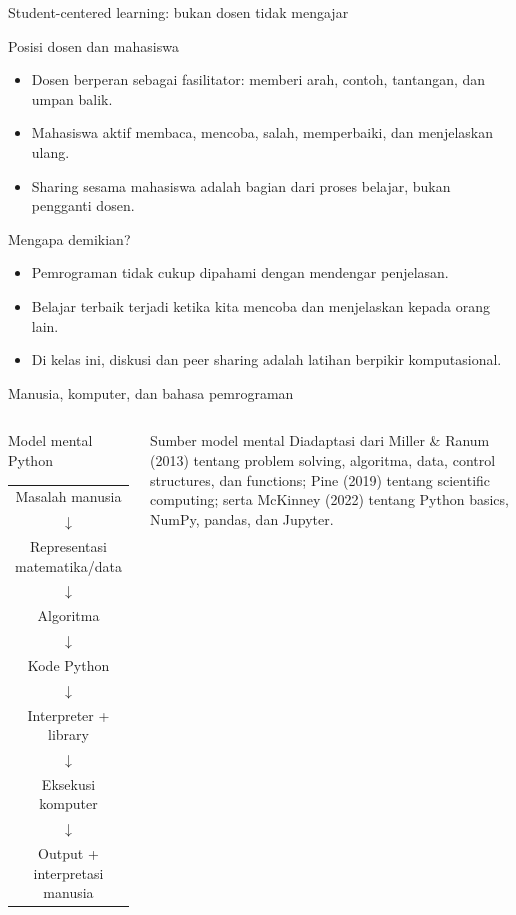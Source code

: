 \documentclass[aspectratio=169,11pt]{beamer}
\begin{document}
\begin{frame}{Student-centered learning: bukan dosen tidak mengajar}
\begin{block}{Posisi dosen dan mahasiswa}
\begin{itemize}
  \item Dosen berperan sebagai fasilitator: memberi arah, contoh, tantangan, dan umpan balik.
  \item Mahasiswa aktif membaca, mencoba, salah, memperbaiki, dan menjelaskan ulang.
  \item Sharing sesama mahasiswa adalah bagian dari proses belajar, bukan pengganti dosen.
\end{itemize}
\end{block}
\begin{block}{Mengapa demikian?}
\begin{itemize}
  \item Pemrograman tidak cukup dipahami dengan mendengar penjelasan.
  \item Belajar terbaik terjadi ketika kita mencoba dan menjelaskan kepada orang lain.
  \item Di kelas ini, diskusi dan peer sharing adalah latihan berpikir komputasional.
\end{itemize}
\end{block}
\end{frame}

\begin{frame}{Manusia, komputer, dan bahasa pemrograman}
\begin{columns}[T]
\begin{block}{Model mental Python}
\centering
\begin{tabular}{c}
Masalah manusia \\
$\downarrow$ \\
Representasi matematika/data \\
$\downarrow$ \\
Algoritma \\
$\downarrow$ \\
Kode Python \\
$\downarrow$ \\
Interpreter + library \\
$\downarrow$ \\
Eksekusi komputer \\
$\downarrow$ \\
Output + interpretasi manusia
\end{tabular}
\end{block}
\begin{block}{Sumber model mental}
Diadaptasi dari Miller \& Ranum (2013) tentang problem solving, algoritma, data, control structures, dan functions; Pine (2019) tentang scientific computing; serta McKinney (2022) tentang Python basics, NumPy, pandas, dan Jupyter.
\end{block}
\end{columns}
\end{frame}
\end{document}
